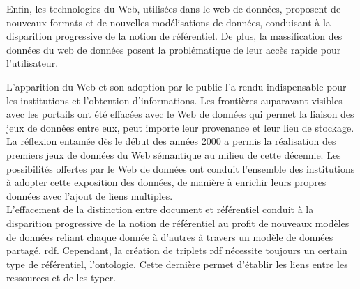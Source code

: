 Enfin, les technologies du Web, utilisées dans le web de données, proposent de nouveaux formats et de nouvelles modélisations de données, conduisant à la disparition progressive de la notion de référentiel. De plus, la massification des données du web de données posent la problématique de leur accès rapide pour l'utilisateur.





\bigskip
\bigskip
\bigskip
L'apparition du Web et son adoption par le public l'a rendu indispensable pour les institutions et l'obtention d'informations. Les frontières auparavant visibles avec les portails ont été effacées avec le Web de données qui permet la liaison des jeux de données entre eux, peut importe leur provenance et leur lieu de stockage. La réflexion entamée dès le début des années 2000 a permis la réalisation des premiers jeux de données du Web sémantique au milieu de cette décennie. Les possibilités offertes par le Web de données ont conduit l'ensemble des institutions à adopter cette exposition des données, de manière à enrichir leurs propres données avec l'ajout de liens multiples.\\

L'effacement de la distinction entre document et référentiel conduit à la disparition progressive de la notion de référentiel au profit de nouveaux modèles de données reliant chaque donnée à d'autres à travers un modèle de données partagé, \ac{rdf}. Cependant, la création de triplets \ac{rdf} nécessite toujours un certain type de référentiel, l'ontologie. Cette dernière permet d'établir les liens entre les ressources et de les typer.